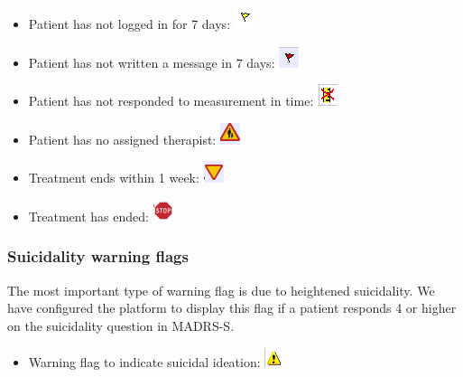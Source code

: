 \documentclass[]{book}
\providecommand{\tightlist}{%
  \setlength{\itemsep}{0pt}\setlength{\parskip}{0pt}}
\theoremstyle{definition}
\theoremstyle{definition}
\theoremstyle{definition}
\theoremstyle{remark}
\begin{document}
\begin{itemize}
\tightlist
\item
  Patient has not logged in for 7 days:
  \includegraphics{images/login-inactivity-flag.png}
\item
  Patient has not written a message in 7 days:
  \includegraphics{images/message-inactivity-flag.png}
\item
  Patient has not responded to measurement in time:
  \includegraphics{images/measurement-delay-flag.png}
\item
  Patient has no assigned therapist:
  \includegraphics{images/notherapist-flag.png}
\item
  Treatment ends within 1 week:
  \includegraphics{images/oneweek-therapyends-flag.png}
\item
  Treatment has ended: \includegraphics{images/therapy-ended-flag.png}
\end{itemize}

\hypertarget{suicidality-warning-flags}{%
\subsubsection{Suicidality warning
flags}\label{suicidality-warning-flags}}

The most important type of warning flag is due to heightened
suicidality. We have configured the platform to display this flag if a
patient responds 4 or higher on the suicidality question in MADRS-S.

\begin{itemize}
\tightlist
\item
  Warning flag to indicate suicidal ideation:
  \includegraphics{images/suicidality-warning.png}
\end{itemize}
\end{document}
